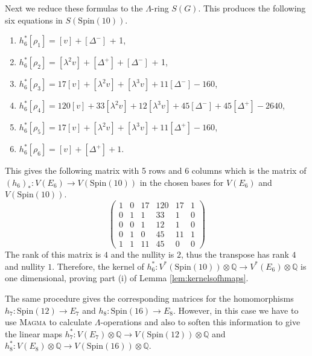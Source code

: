 \documentclass[twoside,a4paper,reqno,11pt]{amsart}
\newcommand{\Q}{\mathbb{Q}}
\renewcommand{\o}{\otimes}
\newcommand{\Spin}{\mathrm{Spin}}
\newcommand{\Magma}{\textsc{Magma}}
\begin{document}
Next we reduce these formulas to the $\Lambda$-ring $S(G)$.  This produces the following six equations in $S(\Spin(10))$.
\begin{enumerate}
\item
$h_6^*[\rho_1] = [v] +  [\Delta^-]$ + 1,
\item 
$h_6^*[\rho_2] = [\lambda^2 v] + [\Delta^+] + [\Delta^-] $ + 1,
\item
$h_6^*[\rho_3] = 17 [v] + [\lambda^2 v] + [\lambda^3 v] +  11[\Delta^-] - 160$,
\item
$h_6^*[\rho_4] = 120[v] + 33[\lambda^2 v] + 12[\lambda^3 v] + 45[\Delta^-]  + 45[\Delta^+] - 2640$,
\item
$h_6^*[\rho_5] = 17[v] + [\lambda^2 v] + [\lambda^3 v] +  11[\Delta^+] -160$,
\item
$h_6^*[\rho_6] = [v] +  [\Delta^+] +1 $.
\end{enumerate}

This gives the following matrix with 5 rows and 6 columns which is the matrix of $(h_6)_* : V(E_6) \to V(\Spin(10))$ in the chosen bases for $V(E_6)$ and $V(\Spin(10))$.
\[
\begin{pmatrix}
1 &  0 & 17 & 120 & 17 & 1 \\
0 &  1 &  1 & 33  & 1  & 0 \\
0 &  0 &  1 & 12  & 1  & 0 \\
0 &  1 &  0 & 45  & 11 & 1 \\
1 &  1 & 11 & 45  & 0  & 0 
\end{pmatrix}
\]
The rank of this matrix is $4$ and the nullity is $2$, thus the transpose has rank $4$ and nullity $1$. Therefore, the kernel of $h_6^*: V^*(\Spin(10))\o\Q \to V^*(E_6)\o\Q$ is one dimensional, proving part (i) of Lemma \ref{lem:kernelsofhmaps}. 

The same procedure gives the corresponding matrices for the  homomorphisms $h_7: \Spin(12) \to E_7$ and $h_8: \Spin(16) \to E_8$.  However, in this case we have to use \Magma{} to calculate $\Lambda$-operations and also to soften this information to give the linear maps $h_7^*: V(E_7)\o\Q \to V(\Spin(12))\o\Q$ and $h_8^*: V(E_8)\o\Q \to V(\Spin(16))\o\Q$. 
\end{document}
